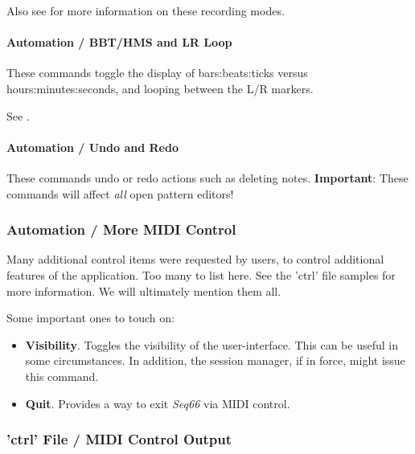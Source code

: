    Also see  for more information on
   these recording modes.

\paragraph{Automation / BBT/HMS and LR Loop}
\label{paragraph:configuration_bbthms_lr_loop}

   These commands toggle the display of bars:beats:ticks versus
   hours:minutes:seconds, and looping between the L/R markers.

   See .

\paragraph{Automation / Undo and Redo}
\label{paragraph:configuration_undo_redo}

   These commands undo or redo actions such as deleting notes.
   \textbf{Important}:
   These commands will affect \textsl{all} open pattern editors!

\subsubsection{Automation / More MIDI Control}
\label{subsubsec:configuration_midi_ctrl_automationex}

   Many additional control items were requested by users, to control
   additional features of the application.  Too many to list here.
   See the 'ctrl' file samples for more information.
   We will ultimately mention them all.

   Some important ones to touch on:

   \begin{itemize}
      \item \textbf{Visibility}.
         Toggles the visibility of the user-interface.
         This can be useful in some circumstances.
         In addition, the session manager, if in force, might
         issue this command.
      \item \textbf{Quit}.
         Provides a way to exit \textsl{Seq66} via MIDI control.
   \end{itemize}

\subsubsection{'ctrl' File / MIDI Control Output}
\label{subsubsec:configuration_ctrl_midi_control_out}

